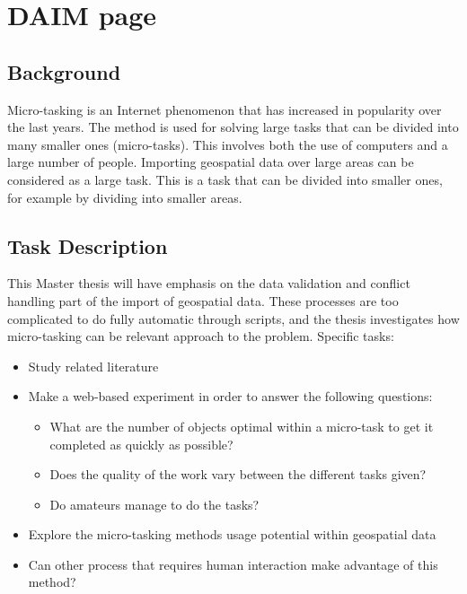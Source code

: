 \chapter*{DAIM page}

\section*{Background}
Micro-tasking is an Internet phenomenon that has increased in popularity over the last years. The method is used for solving large tasks that can be divided into many smaller ones (micro-tasks).  This involves both the use of computers and a large number of people. Importing geospatial data over large areas can be considered as a large task. This is a task that can be divided into smaller ones, for example by dividing into smaller areas.

\section*{Task Description}

This Master thesis will have emphasis on the data validation and conflict handling part of the import of geospatial data. These processes are too complicated to do fully automatic through scripts, and the thesis investigates how micro-tasking can be relevant approach to the problem.  
Specific tasks:
\begin{itemize}
	\item Study related literature
	\item Make a web-based experiment in order to answer the following questions:
	\begin{itemize}
		\item What are the number of objects optimal within a micro-task to get it completed as quickly as possible?
		\item Does the quality of the work vary between the different tasks given?
		\item Do amateurs manage to do the tasks?
	\end{itemize}
	\item Explore the micro-tasking methods usage potential within geospatial data
	\item Can other process that requires human interaction make advantage of this method?
\end{itemize}


